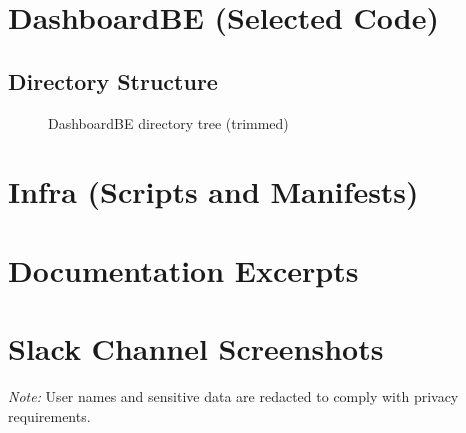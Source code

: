 \documentclass[11pt, a4paper, oneside, listof=totoc]{scrartcl}
\begin{document}

        \section{DashboardBE (Selected Code)}\label{app:dashboardbe}

            \subsection*{Directory Structure}
            \begin{figure}[H]
                \centering
                \caption{DashboardBE directory tree (trimmed)}\label{fig:dashboardbe-tree}
            \end{figure}

        \cleardoublepage
            

        \section{Infra (Scripts and Manifests)}\label{app:infra}

            \label{fig:infra-tree}


        \cleardoublepage

        \section{Documentation Excerpts}\label{app:docs}

        \cleardoublepage

        \section{Slack Channel Screenshots}\label{app:slack}

            \noindent\textit{Note:} User names and sensitive data are redacted to comply with privacy requirements.
\end{document}
